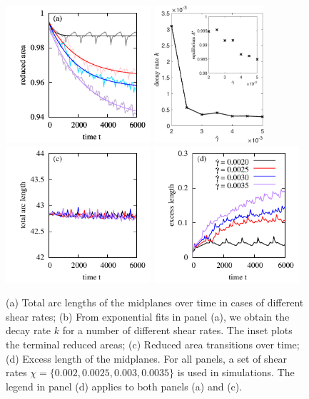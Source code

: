 \documentclass[lineno]{jfm}
\begin{document}
\begin{figure}
\begin{center}
\hspace{-0.6cm}
\includegraphics[height=2in]{ReducedArea.pdf}
\hspace{0.6cm}
\includegraphics[height=2in]{DecayRate.eps}\\
\includegraphics[height=2in]{ArcLength.pdf}
\includegraphics[height=2in]{ExcLength.pdf}
\end{center} 
  \caption{(a) Total arc lengths of the midplanes over time in cases of different shear rates; (b) From exponential fits in panel (a), we obtain the decay rate $k$ for a number of different shear rates. The inset plots the terminal reduced areas; (c) Reduced area transitions over time; (d) Excess length of the midplanes.
For all panels, a set of shear rates $\chi=\{0.002,0.0025,0.003,0.0035\}$ is used in simulations. 
The legend in panel (d) applies to both panels (a) and (c). 
  }
    \label{figure4}
\end{figure}
\end{document}
